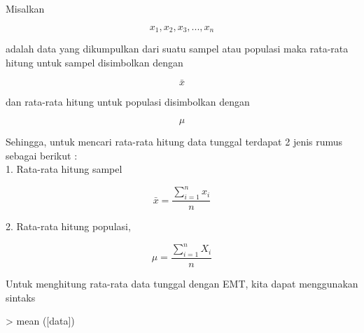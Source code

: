 \documentclass[a4paper,10pt]{article}
\begin{document}
\begin{eulernotebook}
\begin{eulercomment}
\begin{eulercomment}
\begin{eulercomment}
\begin{eulercomment}
\begin{eulercomment}
\begin{eulercomment}
\begin{eulercomment}
\begin{eulercomment}
\begin{eulercomment}
\begin{eulercomment}
\begin{eulercomment}
\begin{eulercomment}
\begin{eulercomment}
\begin{eulercomment}
\begin{eulercomment}
\end{eulercomment}
\begin{eulercomment}
Misalkan\\
\end{eulercomment}
\begin{eulerformula}
\[
x_1 , x_2 , x_3 ,..., x_n
\]
\end{eulerformula}
\begin{eulercomment}
adalah data yang dikumpulkan dari suatu sampel atau populasi maka
rata-rata hitung untuk sampel disimbolkan dengan\\
\end{eulercomment}
\begin{eulerformula}
\[
\bar{x}
\]
\end{eulerformula}
\begin{eulercomment}
dan rata-rata hitung untuk populasi disimbolkan dengan\\
\end{eulercomment}
\begin{eulerformula}
\[
\mu
\]
\end{eulerformula}
\begin{eulercomment}
Sehingga, untuk mencari rata-rata hitung data tunggal terdapat 2 jenis
rumus sebagai berikut :\\
1. Rata-rata hitung sampel\\
\end{eulercomment}
\begin{eulerformula}
\[
\bar{x}=\frac{\sum_{i=1}^{n} x_i}{n}
\]
\end{eulerformula}
\begin{eulercomment}
2. Rata-rata hitung populasi,\\
\end{eulercomment}
\begin{eulerformula}
\[
\mu=\frac{\sum_{i=1}^{n} X_i}{n}
\]
\end{eulerformula}
\begin{eulercomment}
Untuk menghitung rata-rata data tunggal dengan EMT, kita dapat
menggunakan sintaks

\textgreater{} mean ([data])


\end{eulercomment}
\end{eulercomment}
\end{eulercomment}
\end{eulercomment}
\end{eulercomment}
\end{eulercomment}
\end{eulercomment}
\end{eulercomment}
\end{eulercomment}
\end{eulercomment}
\end{eulercomment}
\end{eulercomment}
\end{eulercomment}
\end{eulercomment}
\end{eulercomment}
\end{eulernotebook}
\end{document}
